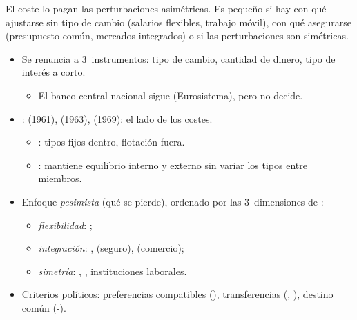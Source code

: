 \documentclass{article}
\begin{document}
\begin{columnas}
\begin{ideaclave}
El coste lo pagan las perturbaciones asimétricas. Es pequeño si hay con qué ajustarse sin tipo de cambio (salarios flexibles, trabajo móvil), con qué asegurarse (presupuesto común, mercados integrados) o si las perturbaciones son simétricas.
\end{ideaclave}

\begin{itemize}
\item Se renuncia a 3~instrumentos: tipo de cambio, cantidad de dinero, tipo de interés a corto.
  \begin{itemize}
  \item El banco central nacional sigue (Eurosistema), pero no decide.
  \end{itemize}
\item {}:  (1961),  (1963),  (1969): el lado de los costes.
  \begin{itemize}
  \item {}: tipos fijos dentro, flotación fuera.
  \item {}: mantiene equilibrio interno y externo sin variar los tipos entre miembros.
  \end{itemize}
\end{itemize}

\begin{itemize}
\item Enfoque \emph{pesimista} (qué se pierde), ordenado por las 3~dimensiones de :
  \begin{itemize}
  \item \emph{flexibilidad}: ;
  \item \emph{integración}: ,  (seguro),  (comercio);
  \item \emph{simetría}: , , instituciones laborales.
  \end{itemize}
\item Criterios políticos: preferencias compatibles (), transferencias (, ), destino común (-).
\end{itemize}


\end{columnas}
\end{document}
